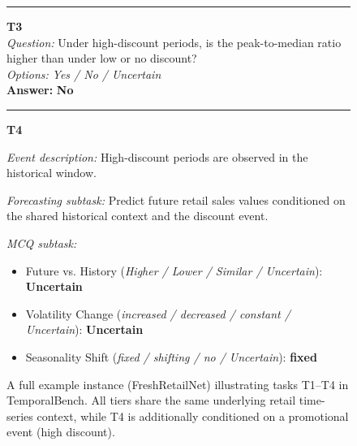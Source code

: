 \begin{figure}[htbp]
\begin{tcolorbox}[
  colback=gray!6,
  colframe=black!20,
  boxrule=0.5pt,
  arc=3pt,
  left=6pt,right=6pt,top=6pt,bottom=6pt
]
\vspace{3pt}\hrule\vspace{4pt}

\textbf{T3} \\
\emph{Question:} Under high-discount periods, is the peak-to-median ratio higher than under low or no discount? \\
\emph{Options:} \textit{Yes / No / Uncertain} \\
\textbf{Answer:} \textbf{No}

\vspace{3pt}\hrule\vspace{4pt}

\textbf{T4}

\emph{Event description:}
High-discount periods are observed in the historical window.

\emph{Forecasting subtask:}
Predict future retail sales values conditioned on the shared historical context and the discount event.

\emph{MCQ subtask:}
\begin{itemize}[leftmargin=1.1em,itemsep=0pt,topsep=0pt,parsep=0pt,partopsep=0pt]
  \item Future vs. History
  (\textit{Higher / Lower / Similar / Uncertain}): \textbf{Uncertain}
  \item Volatility Change
  (\textit{increased / decreased / constant / Uncertain}): \textbf{Uncertain}
  \item Seasonality Shift
  (\textit{fixed / shifting / no / Uncertain}): \textbf{fixed}
\end{itemize}

\end{tcolorbox}
\caption{A full example instance (FreshRetailNet) illustrating tasks T1--T4 in TemporalBench. All tiers share the same underlying retail time-series context, while T4 is additionally conditioned on a promotional event (high discount).}
\label{fig:appendix_freshretailnet_one_example}
\end{figure}


